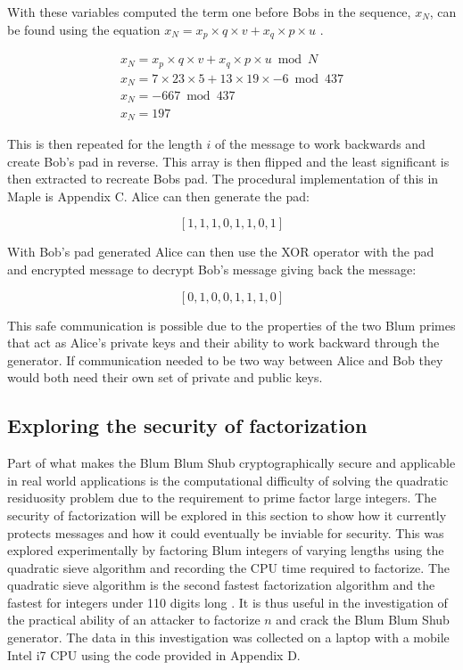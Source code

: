 \documentclass{article}
\begin{document}
With these variables computed the term one before Bobs in the sequence, $x_N$, can be found using the equation $x_N = x_p \times q \times v+x_q \times p \times u$ \cite{Blum1986}.

$$
\begin{array}{l}
x_N = x_p \times q \times v+x_q \times p \times u \bmod N \\
x_N = 7 \times 23 \times 5+13 \times 19 \times -6 \bmod 437 \\
x_N = -667 \bmod 437 \\
x_N = 197
\end{array}
$$

This is then repeated for the length $i$ of the message to work backwards and create Bob's pad in reverse. This array is then flipped and the least significant is then extracted to recreate Bobs pad. The procedural implementation of this in Maple is Appendix C. Alice can then generate the pad:

$$[1, 1, 1, 0, 1, 1, 0, 1]$$

With Bob's pad generated Alice can then use the XOR operator with the pad and encrypted message to decrypt Bob's message giving back the message:

$$[0, 1, 0, 0, 1, 1, 1, 0]$$

This safe communication is possible due to the properties of the two Blum primes that act as Alice's private keys and their ability to work backward through the generator. If communication needed to be two way between Alice and Bob they would both need their own set of private and public keys. 

\subsection{Exploring the security of factorization}

Part of what makes the Blum Blum Shub cryptographically secure and applicable in real world applications is the computational difficulty of solving the quadratic residuosity problem due to the requirement to prime factor large integers. The security of factorization will be explored in this section to show how it currently protects messages and how it could eventually be inviable for security. This was explored experimentally by factoring Blum integers of varying lengths using the quadratic sieve algorithm and recording the CPU time required to factorize. The quadratic sieve algorithm is the second fastest factorization algorithm and the fastest for integers under 110 digits long \cite{Landquist2001}. It is thus useful in the investigation of the practical ability of an attacker to factorize $n$ and crack the Blum Blum Shub generator. The data in this investigation was collected on a laptop with a mobile Intel i7 CPU using the code provided in Appendix D. 
\end{document}
